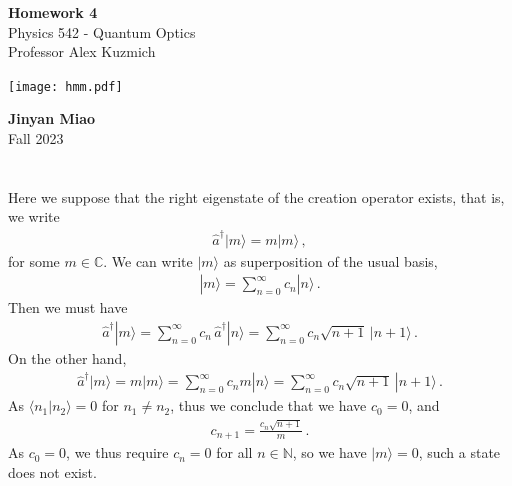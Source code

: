 \documentclass[11pt, oneside]{book}
\theoremstyle{break}
\theoremstyle{break}
\newcommand{\N}{\mathbb{N}}
\newcommand{\C}{\mathbb{C}}
\begin{document}
	\begin{titlepage}
		\begin{center}
			\vspace*{0.5cm}
			\Huge \color{red}
				\textbf{Homework 4}\\
			\vspace{0.5cm}			
			\Large \color{black}
			Physics 542 - Quantum Optics\\
			Professor Alex Kuzmich
			\vspace{1.5cm}

			\texttt{[image: hmm.pdf]}
			
			
			\vspace{2cm}
			\LARGE
				\textbf{Jinyan Miao}\\
				\hfill\break
				\LARGE Fall 2023\\
			\vspace{1cm}

		\vspace*{\fill}
		\end{center}			
	\end{titlepage}

\chapter{}
Here we suppose that the right eigenstate of the creation operator exists, that is, we write
\begin{align*}
\hat{a}^\dagger |m\rangle = m |m\rangle\,,
\end{align*}
for some $m \in \C$. We can write $|m\rangle$ as superposition of the usual basis,
\begin{align*}
|m\rangle = \sum_{n=0}^\infty c_n |n\rangle\,.
\end{align*}
Then we must have
\begin{align*}
\hat{a}^\dagger |m\rangle =\sum_{n=0}^\infty c_n \,\hat{a}^\dagger |n\rangle = \sum_{n=0}^\infty c_n \sqrt{n+1}\, | n+1\rangle\,.
\end{align*}
On the other hand, 
\begin{align*}
\hat{a}^\dagger |m\rangle =m|m\rangle = \sum_{n=0}^\infty c_n m |n\rangle = \sum_{n=0}^\infty c_n \sqrt{n+1}\, | n+1\rangle\,.
\end{align*}
As $\langle n_1 |n_2\rangle =0$ for $n_1\neq n_2$, thus we conclude that we have $c_0 = 0$, and 
\begin{align*}
c_{n+1} = \frac{c_n \sqrt{n+1}}{m}\,.
\end{align*}
As $c_0 = 0$, we thus require $c_n = 0$ for all $n \in \N$, so we have $|m\rangle = 0$, such a state does not exist. 
\end{document}
